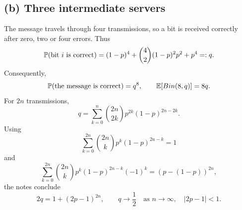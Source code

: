 \documentclass[a4paper]{article}
\begin{document}
\subsection*{(b) Three intermediate servers}
The message travels through four transmissions, so a bit is received correctly after zero, two or four errors. Thus
\[\P(\text{bit }i\text{ is correct})=(1-p)^4+\binom42(1-p)^2p^2+p^4=:q.\]
Consequently,
\[\P(\text{the message is correct})=q^8,\qquad\E[Bin(8,q)]=8q.\]
For $2n$ transmissions,
\[q=\sum_{k=0}^n\binom{2n}{2k}p^{2k}(1-p)^{2n-2k}.\]
Using
\[\sum_{k=0}^{2n}\binom{2n}{k}p^k(1-p)^{2n-k}=1\]
and
\[\sum_{k=0}^{2n}\binom{2n}{k}p^k(1-p)^{2n-k}(-1)^k=(p-(1-p))^{2n},\]
the notes conclude
\[2q=1+(2p-1)^{2n},\qquad q\longrightarrow\frac12\quad\text{as }n\to\infty,\quad |2p-1|<1.\]
\end{document}
